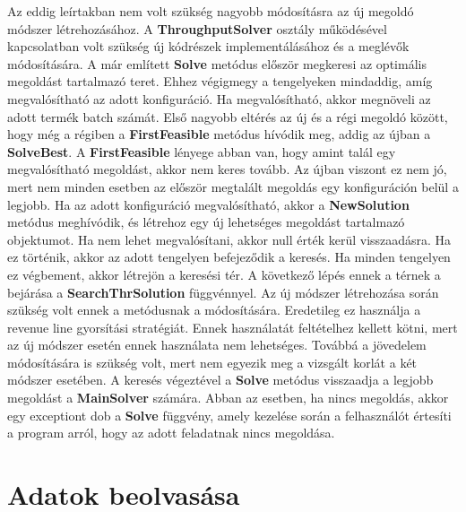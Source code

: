 Az eddig leírtakban nem volt szükség nagyobb módosításra az új megoldó módszer létrehozásához.
A \textbf{ThroughputSolver} osztály működésével kapcsolatban volt szükség új kódrészek implementálásához és a meglévők módosítására.
A már említett \textbf{Solve} metódus először megkeresi az optimális megoldást tartalmazó teret.
Ehhez végigmegy a tengelyeken mindaddig, amíg megvalósítható az adott konfiguráció.
Ha megvalósítható, akkor megnöveli az adott termék batch számát.
Első nagyobb eltérés az új és a régi megoldó között, hogy még a régiben a \textbf{FirstFeasible} metódus hívódik meg, addig az újban a \textbf{SolveBest}.
A \textbf{FirstFeasible} lényege abban van, hogy amint talál egy megvalósítható megoldást, akkor nem keres tovább.
Az újban viszont ez nem jó, mert nem minden esetben az először megtalált megoldás egy konfiguráción belül a legjobb. Ha az adott konfiguráció megvalósítható, akkor a \textbf{NewSolution}
metódus meghívódik, és létrehoz egy új lehetséges megoldást tartalmazó objektumot.
Ha nem lehet megvalósítani, akkor null érték kerül visszaadásra.
Ha ez történik, akkor az adott tengelyen befejeződik a keresés.
Ha minden tengelyen ez végbement, akkor létrejön a keresési tér.
A következő lépés ennek a térnek a bejárása a \textbf{SearchThrSolution} függvénnyel.
Az új módszer létrehozása során szükség volt ennek a metódusnak a módosítására.
Eredetileg ez használja a revenue line gyorsítási stratégiát.
Ennek használatát feltételhez kellett kötni, mert az új módszer esetén ennek használata nem lehetséges.
Továbbá a jövedelem módosítására is szükség volt, mert nem egyezik meg a vizsgált korlát a két módszer esetében.
A keresés végeztével a \textbf{Solve} metódus visszaadja a legjobb megoldást a \textbf{MainSolver} számára.
Abban az esetben, ha nincs megoldás, akkor egy exceptiont dob a \textbf{Solve} függvény, amely kezelése során a felhasználót értesíti a program arról, hogy az adott feladatnak nincs megoldása.

\section{Adatok beolvasása}
